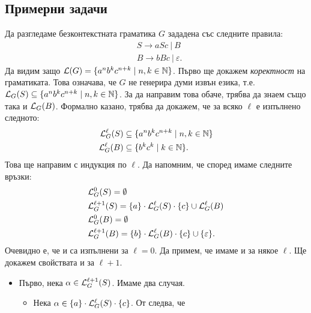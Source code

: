 \subsection{Примерни задачи}

\begin{extra}
  \begin{example}
    Да разгледаме безконтекстната граматика $G$ зададена със следните правила:
    \begin{align*}
      & S \to aSc\ |\  B\\
      & B \to bBc\ |\ \varepsilon.
    \end{align*}
    Да видим защо $\mathcal{L}(G) = \{a^nb^kc^{n+k} \mid n,k\in\mathbb{N}\}$.
    Първо ще докажем \emph{коректност} на граматиката. Това означава, че $G$ не генерира думи извън езика, т.е.
    $\mathcal{L}_G(S) \subseteq \{a^nb^kc^{n+k} \mid n,k\in\mathbb{N}\}$. За да направим това обаче, трябва да знаем също така и $\mathcal{L}_G(B)$.
    Формално казано, трябва да докажем, че за всяко $\ell$ е изпълнено следното:
    \begin{align}
      \mathcal{L}^\ell_G(S) & \subseteq \{a^nb^kc^{n+k} \mid n,k\in\mathbb{N}\} \label{eq:nknk1}\\
      \mathcal{L}^\ell_G(B) & \subseteq \{b^kc^k \mid k \in \mathbb{N}\} \label{eq:nknk2}.
    \end{align}
    Това ще направим с индукция по $\ell$.
    Да напомним, че според  имаме следните връзки:
    \begin{align*}
      & \mathcal{L}^0_G(S) = \emptyset\\
      & \mathcal{L}^{\ell+1}_G(S) = \{a\} \cdot \mathcal{L}^\ell_G(S) \cdot \{c\} \cup \mathcal{L}^\ell_G(B)\\
      & \mathcal{L}^0_G(B) = \emptyset\\
      & \mathcal{L}^{\ell+1}_G(B) = \{b\} \cdot \mathcal{L}^\ell_G(B) \cdot \{c\} \cup \{\varepsilon\}.
    \end{align*}
    Очевидно е, че  и  са изпълнени за $\ell = 0$.
    Да примем, че имаме  и  за някое $\ell$.
    Ще докажем свойствата и за $\ell+1$.
    \begin{itemize}
    \item
      Първо, нека $\alpha \in \mathcal{L}^{\ell+1}_G(S)$. Имаме два случая.
      \begin{itemize}
      \item
        Нека $\alpha \in \{a\} \cdot \mathcal{L}^\ell_G(S) \cdot \{c\}$. От \IndHyp следва, че

\end{itemize}
\end{itemize}
\end{example}
\end{extra}
